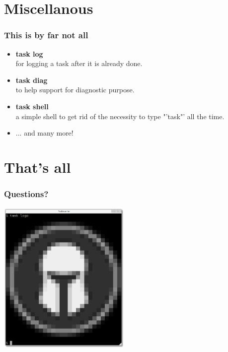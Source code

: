 \documentclass[t,handout]{beamer}
\begin{document}
\section{Miscellanous}

\begin{frame}
\frametitle{This is by far not all}
\begin{itemize}
\item \textbf{task log}  \\
for logging a task after it is already done.
\item \textbf{task diag} \\
to help support for diagnostic purpose.
\item \textbf{task shell} \\
a simple shell to get rid of the necessity to type "'task"' all the time.
\item ... and many more!
\end{itemize}
\end{frame}

\section{That's all}

\begin{frame}
\frametitle{Questions?}
\begin{center}
\includegraphics[width=6.4cm,height=7.5cm]{task_logo.png}
\end{center}
\end{frame}
\end{document}
